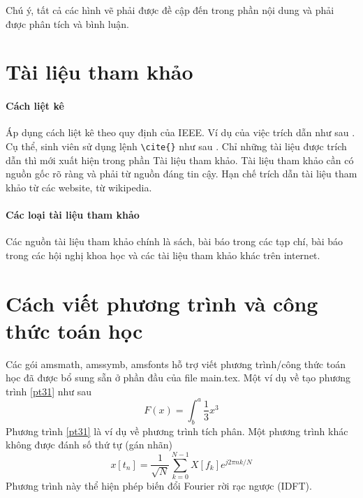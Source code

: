 \documentclass[../DoAn.tex]{subfiles}
\begin{document}
Chú ý, tất cả các hình vẽ phải được đề cập đến trong phần nội dung và phải được phân tích và bình luận.

\section{Tài liệu tham khảo}
\paragraph{Cách liệt kê}\mbox{}

Áp dụng cách liệt kê theo quy định của IEEE. Ví dụ của việc trích dẫn như sau \cite{scott2013sdn}. Cụ thể, sinh viên sử dụng lệnh \verb!\cite{}! như sau \cite{ashton2009internet}. Chỉ những tài liệu được trích dẫn thì mới xuất hiện trong phần Tài liệu tham khảo. Tài liệu tham khảo cần có nguồn gốc rõ ràng và phải từ nguồn đáng tin cậy. Hạn chế trích dẫn tài liệu tham khảo từ các website, từ wikipedia.
\paragraph{Các loại tài liệu tham khảo}\mbox{}

Các nguồn tài liệu tham khảo chính là sách, bài báo trong các tạp chí, bài báo trong các hội nghị khoa học và các tài liệu tham khảo khác trên internet.

\section{Cách viết phương trình và công thức toán học}
Các gói amsmath, amssymb, amsfonts hỗ trợ viết phương trình/công thức toán học đã được bổ sung sẵn ở phần đầu của file main.tex. Một ví dụ về tạo phương trình \eqref{pt31} như sau
\begin{equation}\label{pt31}
  F(x) = \int^a_b \frac{1}{3}x^3
\end{equation}
Phương trình \ref{pt31} là ví dụ về phương trình tích phân. Một phương trình khác không được đánh số thứ tự (gán nhãn)
\begin{equation*}\label{pt32}
  x[t_n] = \frac{1}{\sqrt{N}} \sum_{k=0}^{N-1}X[f_k]e^{j 2\pi n k/N}
\end{equation*}
Phương trình này thể hiện phép biến đổi Fourier rời rạc ngược (IDFT).
\end{document}
